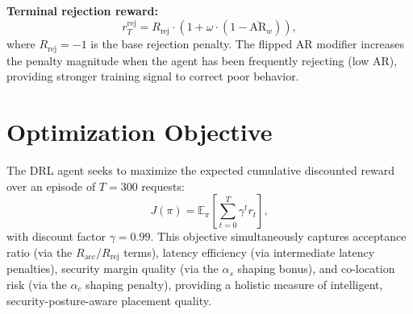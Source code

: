 \textbf{Terminal rejection reward:}
\begin{equation}
r_T^{\text{rej}} = R_{\text{rej}} \cdot \left(1 + \omega \cdot (1 - \overline{\text{AR}}_w)\right),
\end{equation}
where $R_{\text{rej}} = -1$ is the base rejection penalty. The flipped AR modifier increases the penalty magnitude when the agent has been frequently rejecting (low AR), providing stronger training signal to correct poor behavior.

\section{Optimization Objective}

The DRL agent seeks to maximize the expected cumulative discounted reward over an episode of $T = 300$ requests:
\begin{equation}
J(\pi) = \mathbb{E}_{\pi}\!\left[\sum_{t=0}^{T} \gamma^t r_t\right],
\end{equation}
with discount factor $\gamma = 0.99$. This objective simultaneously captures acceptance ratio (via the $R_{\text{acc}} / R_{\text{rej}}$ terms), latency efficiency (via intermediate latency penalties), security margin quality (via the $\alpha_s$ shaping bonus), and co-location risk (via the $\alpha_c$ shaping penalty), providing a holistic measure of intelligent, security-posture-aware placement quality.
